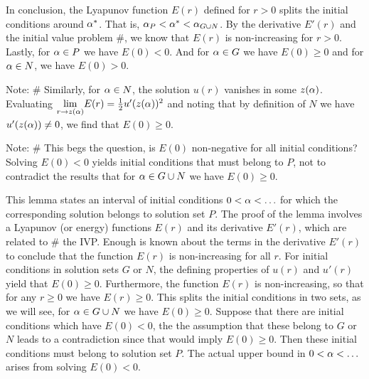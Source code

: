 In conclusion, the Lyapunov function $E(r)$ defined for $r>0$ splits the
initial conditions around $\alpha^*$. That is, $\alpha_P<\alpha^*<\alpha_{G\cup N}$. By the
derivative $E'(r)$ and the initial value problem \#, we know that $E(r)$ is
non-increasing for $r>0$. Lastly, for $\alpha\in P$ we have $E(0)<0$. And for
$\alpha\in G$ we have $E(0)\geq0$ and for $\alpha\in N$, we have $E(0)>0$.

Note: \# Similarly, for $\alpha\in N$, the solution $u(r)$ vanishes in some $z(\alpha)$.
Evaluating $\underset{r\to z(\alpha)}{\lim}E(r)=\frac{1}{2}u'(z(\alpha))^2$ and noting that
by definition of $N$ we have $u'(z(\alpha))\neq0$, we find that $E(0)\geq0$.

Note: \# This begs the question, is $E(0)$ non-negative for all initial
conditions? Solving $E(0)<0$ yields initial conditions that must belong to $P$,
not to contradict the results that for $\alpha\in G\cup N$ we have $E(0)\geq0$.

This lemma states an interval of initial conditions $0<\alpha<\ldots$ for which the
corresponding  solution belongs to solution set $P$. The proof of the lemma
involves a Lyapunov (or energy) functions $E(r)$ and its derivative $E'(r)$,
which are related to \# the IVP. Enough is known about the terms in the
derivative $E'(r)$ to conclude that the function $E(r)$ is non-increasing for
all $r$. For initial conditions in solution sets $G$ or $N$, the defining
properties of $u(r)$ and $u'(r)$ yield that $E(0)\geq0$. Furthermore, the
function $E(r)$ is non-increasing, so that for any $r\geq0$ we have
$E(r)\geq0$. This splits the initial conditions in two sets, as we will see,
for $\alpha\in G\cup N$ we have $E(0)\geq0$. Suppose that there are initial
conditions which have $E(0)<0$, the the assumption that these belong to $G$ or
$N$ leads to a contradiction since that would imply $E(0)\geq0$. Then these
initial conditions must belong to solution set $P$. The actual upper bound in
$0<\alpha<\ldots$ arises from solving $E(0)<0$.

